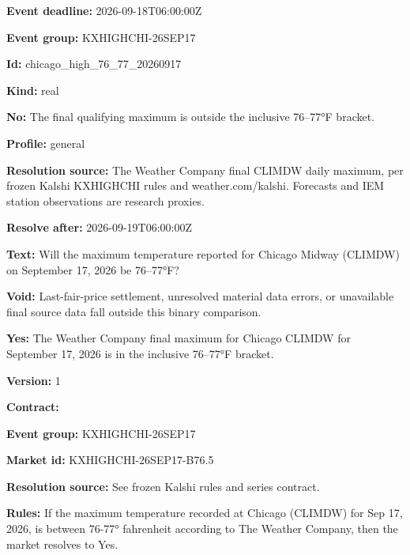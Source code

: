 \documentclass[11pt]{article}
\begin{document}
\par\noindent\textbf{Event deadline:} 2026-09-18T06:00:00Z

\par\noindent\textbf{Event group:} KXHIGHCHI-26SEP17

\par\noindent\textbf{Id:} chicago\_high\_76\_77\_20260917

\par\noindent\textbf{Kind:} real

\par\noindent\textbf{No:} The final qualifying maximum is outside the inclusive 76–77°F bracket.

\par\noindent\textbf{Profile:} general

\par\noindent\textbf{Resolution source:} The Weather Company final CLIMDW daily maximum, per frozen Kalshi KXHIGHCHI rules and weather.com/kalshi. Forecasts and IEM station observations are research proxies.

\par\noindent\textbf{Resolve after:} 2026-09-19T06:00:00Z

\par\noindent\textbf{Text:} Will the maximum temperature reported for Chicago Midway (CLIMDW) on September 17, 2026 be 76–77°F?

\par\noindent\textbf{Void:} Last-fair-price settlement, unresolved material data errors, or unavailable final source data fall outside this binary comparison.

\par\noindent\textbf{Yes:} The Weather Company final maximum for Chicago CLIMDW for September 17, 2026 is in the inclusive 76–77°F bracket.

\par\noindent\textbf{Version:} 1

\par\noindent\textbf{Contract:} \par \par\noindent\textbf{Event group:} KXHIGHCHI-26SEP17

\par\noindent\textbf{Market id:} KXHIGHCHI-26SEP17-B76.5

\par\noindent\textbf{Resolution source:} See frozen Kalshi rules and series contract.

\par\noindent\textbf{Rules:} If the maximum temperature recorded at Chicago (CLIMDW) for Sep 17, 2026, is between 76-77° fahrenheit according to The Weather Company, then the market resolves to Yes.
\end{document}

